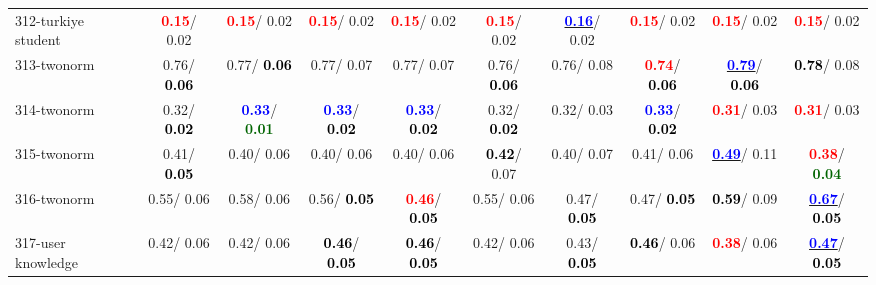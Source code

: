 \begin{table}[h]
\begin{center}
{\begin{tabular}{lc|c|c|c|c|c|c|c|c}
312-turkiye student & \textcolor{red}{\textbf{  0.15}}/  0.02 & \textcolor{red}{\textbf{  0.15}}/  0.02 & \textcolor{red}{\textbf{  0.15}}/  0.02 & \textcolor{red}{\textbf{  0.15}}/  0.02 & \textcolor{red}{\textbf{  0.15}}/  0.02 & \underline{\textcolor{blue}{\textbf{  0.16}}}/  0.02 & \textcolor{red}{\textbf{  0.15}}/  0.02 & \textcolor{red}{\textbf{  0.15}}/  0.02 & \textcolor{red}{\textbf{  0.15}}/  0.02 \\
313-twonorm &   0.76/\textcolor{black}{\textbf{  0.06}} &   0.77/\textcolor{black}{\textbf{  0.06}} &   0.77/  0.07 &   0.77/  0.07 &   0.76/\textcolor{black}{\textbf{  0.06}} &   0.76/  0.08 & \textcolor{red}{\textbf{  0.74}}/\textcolor{black}{\textbf{  0.06}} & \underline{\textcolor{blue}{\textbf{  0.79}}}/\textcolor{black}{\textbf{  0.06}} & \textcolor{black}{\textbf{  0.78}}/  0.08 \\
314-twonorm &   0.32/\textcolor{black}{\textbf{  0.02}} & \textcolor{blue}{\textbf{  0.33}}/\textcolor{darkgreen}{\textbf{  0.01}} & \textcolor{blue}{\textbf{  0.33}}/\textcolor{black}{\textbf{  0.02}} & \textcolor{blue}{\textbf{  0.33}}/\textcolor{black}{\textbf{  0.02}} &   0.32/\textcolor{black}{\textbf{  0.02}} &   0.32/  0.03 & \textcolor{blue}{\textbf{  0.33}}/\textcolor{black}{\textbf{  0.02}} & \textcolor{red}{\textbf{  0.31}}/  0.03 & \textcolor{red}{\textbf{  0.31}}/  0.03 \\
315-twonorm &   0.41/\textcolor{black}{\textbf{  0.05}} &   0.40/  0.06 &   0.40/  0.06 &   0.40/  0.06 & \textcolor{black}{\textbf{  0.42}}/  0.07 &   0.40/  0.07 &   0.41/  0.06 & \underline{\textcolor{blue}{\textbf{  0.49}}}/  0.11 & \textcolor{red}{\textbf{  0.38}}/\textcolor{darkgreen}{\textbf{  0.04}} \\
316-twonorm &   0.55/  0.06 &   0.58/  0.06 &   0.56/\textcolor{black}{\textbf{  0.05}} & \textcolor{red}{\textbf{  0.46}}/\textcolor{black}{\textbf{  0.05}} &   0.55/  0.06 &   0.47/\textcolor{black}{\textbf{  0.05}} &   0.47/\textcolor{black}{\textbf{  0.05}} & \textcolor{black}{\textbf{  0.59}}/  0.09 & \underline{\textcolor{blue}{\textbf{  0.67}}}/\textcolor{black}{\textbf{  0.05}} \\ \hline
317-user knowledge &   0.42/  0.06 &   0.42/  0.06 & \textcolor{black}{\textbf{  0.46}}/\textcolor{black}{\textbf{  0.05}} & \textcolor{black}{\textbf{  0.46}}/\textcolor{black}{\textbf{  0.05}} &   0.42/  0.06 &   0.43/\textcolor{black}{\textbf{  0.05}} & \textcolor{black}{\textbf{  0.46}}/  0.06 & \textcolor{red}{\textbf{  0.38}}/  0.06 & \underline{\textcolor{blue}{\textbf{  0.47}}}/\textcolor{black}{\textbf{  0.05}} \\

\end{tabular}}
\end{center}
\end{table}
